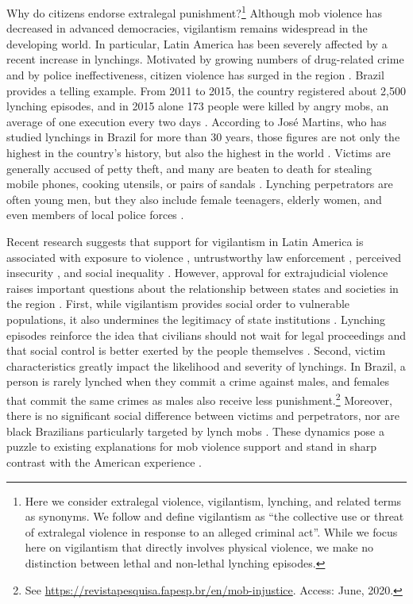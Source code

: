 \documentclass[12pt,a4paper,]{article}
\begin{document}
Why do citizens endorse extralegal punishment?\footnote{Here we consider
  extralegal violence, vigilantism, lynching, and related terms as
  synonyms. We follow \citet[6]{moncada2017varieties} and define
  vigilantism as ``the collective use or threat of extralegal violence
  in response to an alleged criminal act''. While we focus here on
  vigilantism that directly involves physical violence, we make no
  distinction between lethal and non-lethal lynching episodes.} Although
mob violence has decreased in advanced democracies, vigilantism remains
widespread in the developing world. In particular, Latin America has
been severely affected by a recent increase in lynchings. Motivated by
growing numbers of drug-related crime and by police ineffectiveness,
citizen violence has surged in the region \citep{mallen2014vigilantes}.
Brazil provides a telling example. From 2011 to 2015, the country
registered about 2,500 lynching episodes, and in 2015 alone 173 people
were killed by angry mobs, an average of one execution every two days
\citep{barbara2015vigilantes, oliveira2016mob}. According to José
Martins, who has studied lynchings in Brazil for more than 30 years,
those figures are not only the highest in the country's history, but
also the highest in the world \citep{pearson2018latam}. Victims are
generally accused of petty theft, and many are beaten to death for
stealing mobile phones, cooking utensils, or pairs of sandals
\citep{barbara2015vigilantes}. Lynching perpetrators are often young
men, but they also include female teenagers, elderly women, and even
members of local police forces
\citep{moura2017linchamentos, oliveira2016mob}.

Recent research suggests that support for vigilantism in Latin America
is associated with exposure to violence \citep{garcia2019anger},
untrustworthy law enforcement \citep{zizumbo2017community}, perceived
insecurity \citep{ceobanu2011crime, godoy2004justice}, and social
inequality \citep{arias2010violent}. However, approval for extrajudicial
violence raises important questions about the relationship between
states and societies in the region \citep{nivette2016institutional}.
First, while vigilantism provides social order to vulnerable
populations, it also undermines the legitimacy of state institutions
\citep{schuberth2013challenging}. Lynching episodes reinforce the idea
that civilians should not wait for legal proceedings and that social
control is better exerted by the people themselves
\citep{black1983crime}. Second, victim characteristics greatly impact
the likelihood and severity of lynchings. In Brazil, a person is rarely
lynched when they commit a crime against males, and females that commit
the same crimes as males also receive less punishment.\footnote{See
  \url{https://revistapesquisa.fapesp.br/en/mob-injustice}. Access:
  June, 2020.} Moreover, there is no significant social difference
between victims and perpetrators, nor are black Brazilians particularly
targeted by lynch mobs \citep{oliveira2016mob}. These dynamics pose a
puzzle to existing explanations for mob violence support and stand in
sharp contrast with the American experience
\citep{smaangs2016doing, wood2011lynching}.
\end{document}
